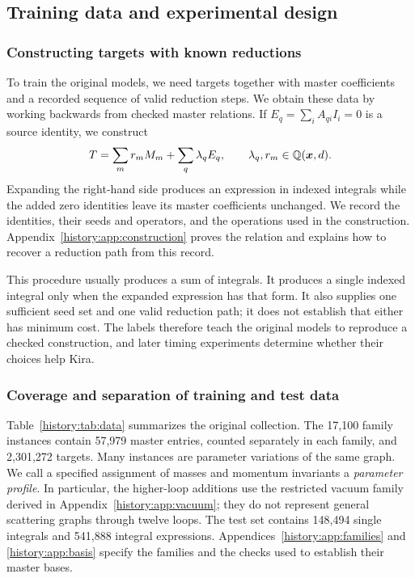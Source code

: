 \subsection{Training data and experimental design}
\label{history:sec:data}
\subsubsection{Constructing targets with known reductions}
To train the original models, we need targets together with master coefficients and a recorded sequence of valid reduction steps. We obtain these data by working backwards from checked master relations. If $E_q=\sum_i A_{qi}I_i=0$ is a source identity, we construct
\begin{equation}
 T=\sum_m r_mM_m+\sum_q\lambda_qE_q,
 \qquad \lambda_q,r_m\in\mathbb Q(\boldsymbol x,d).
 \label{history:eq:reverse}
\end{equation}
Expanding the right-hand side produces an expression in indexed integrals while the added zero identities leave its master coefficients unchanged. We record the identities, their seeds and operators, and the operations used in the construction. Appendix~\ref{history:app:construction} proves the relation and explains how to recover a reduction path from this record.

This procedure usually produces a sum of integrals. It produces a single indexed integral only when the expanded expression has that form. It also supplies one sufficient seed set and one valid reduction path; it does not establish that either has minimum cost. The labels therefore teach the original models to reproduce a checked construction, and later timing experiments determine whether their choices help Kira.

\subsubsection{Coverage and separation of training and test data}
Table~\ref{history:tab:data} summarizes the original collection. The 17,100 family instances contain 57,979 master entries, counted separately in each family, and 2,301,272 targets. Many instances are parameter variations of the same graph. We call a specified assignment of masses and momentum invariants a \emph{parameter profile}. In particular, the higher-loop additions use the restricted vacuum family derived in Appendix~\ref{history:app:vacuum}; they do not represent general scattering graphs through twelve loops. The test set contains 148,494 single integrals and 541,888 integral expressions. Appendices~\ref{history:app:families} and \ref{history:app:basis} specify the families and the checks used to establish their master bases.

